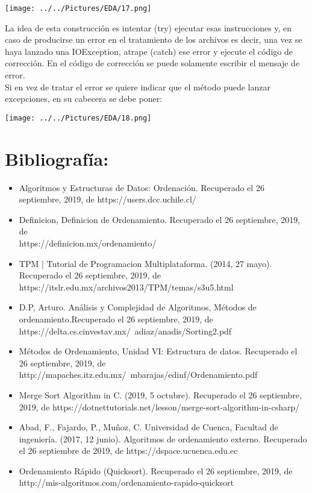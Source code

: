 \documentclass[12pt,letterpaper]{report}
\begin{document}
\begin{center}
\texttt{[image: ../../Pictures/EDA/17.png]} 
\end{center}
La idea de esta construcción es intentar (try) ejecutar esas instrucciones y, en caso de producirse un error en el tratamiento de los archivos es decir, una vez se haya lanzado una IOException, atrape (catch) ese error y  ejecute el código de corrección. 
En el código de corrección se puede solamente escribir el mensaje de error.\\Si en vez de tratar el error se quiere indicar que el  método puede lanzar excepciones, en su cabecera se debe poner:
\begin{center}
\texttt{[image: ../../Pictures/EDA/18.png]} 
\clearpage
\section*{\centering \LARGE Bibliografía:}
\begin{itemize}
	\item Algoritmos y Estructuras de Datos: Ordenación. Recuperado el 26 septiembre, 2019, de https://users.dcc.uchile.cl/%
	\item Definicion, Definicion de Ordenamiento. Recuperado el 26 septiembre, 2019, de \\ https://definicion.mx/ordenamiento/
	\item	TPM | Tutorial de Programacion Multiplataforma. (2014, 27 mayo). Recuperado el 26 septiembre, 2019, de https://itslr.edu.mx/archivos2013/TPM/temas/s3u5.html
	\item D.P, Arturo. Análisis y Complejidad de Algoritmos, Métodos de ordenamiento.Recuperado el 26 septiembre, 2019, de  https://delta.cs.cinvestav.mx/~adiaz/anadis/Sorting2.pdf
	\item Métodos de Ordenamiento, Unidad VI: Estructura de datos. Recuperado el 26 septiembre, 2019, de  http://mapaches.itz.edu.mx/~mbarajas/edinf/Ordenamiento.pdf
	\item Merge Sort Algorithm in C. (2019, 5 octubre). Recuperado el 26 septiembre, 2019, de  https://dotnettutorials.net/lesson/merge-sort-algorithm-in-csharp/
	\item Abad, F., Fajardo, P., Muñoz, C. Universidad de Cuenca, Facultad de ingeniería. (2017, 12 junio). Algoritmos de ordenamiento externo. Recuperado el 26 septiembre de 2019, de https://dspace.ucuenca.edu.ec
	\item Ordenamiento Rápido (Quicksort). Recuperado el 26 septiembre, 2019, de \\ http://mis-algoritmos.com/ordenamiento-rapido-quicksort

\end{itemize}
\end{center}
\end{document}

